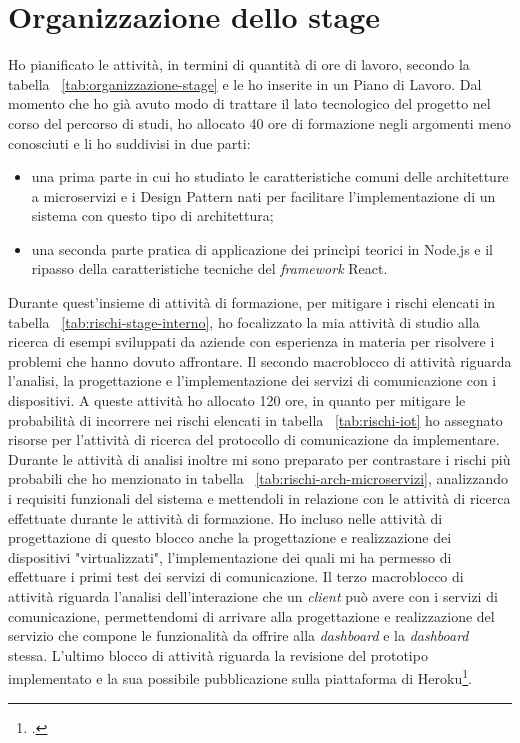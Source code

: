 \section{Organizzazione dello stage}

Ho pianificato le attività, in termini di quantità di ore di lavoro, secondo la tabella ~\ref{tab:organizzazione-stage} e le ho inserite in un Piano di Lavoro.
Dal momento che ho già avuto modo di trattare il lato tecnologico del progetto nel corso del percorso di studi, ho allocato 40 ore di formazione negli argomenti meno conosciuti e li ho suddivisi in due parti:
\begin{itemize}
  \item una prima parte in cui ho studiato le caratteristiche comuni delle architetture a microservizi e i Design Pattern nati per facilitare l'implementazione di un sistema con questo tipo di architettura;
  \item una seconda parte pratica di applicazione dei princìpi teorici in Node.js e il ripasso della caratteristiche tecniche del \emph{framework} React.
\end{itemize}
Durante quest'insieme di attività di formazione, per mitigare i rischi elencati in tabella ~\ref{tab:rischi-stage-interno}, ho focalizzato la mia attività di studio alla ricerca di esempi sviluppati da aziende con esperienza in materia per risolvere i problemi che hanno dovuto affrontare.
Il secondo macroblocco di attività riguarda l'analisi, la progettazione e l'implementazione dei servizi di comunicazione con i dispositivi. A queste attività ho allocato 120 ore, in quanto per mitigare le probabilità di incorrere nei rischi elencati in tabella ~\ref{tab:rischi-iot} ho assegnato risorse per l'attività di ricerca del protocollo di comunicazione da implementare. Durante le attività di analisi inoltre mi sono preparato per contrastare i rischi più probabili che ho menzionato in tabella ~\ref{tab:rischi-arch-microservizi}, analizzando i requisiti funzionali del sistema e mettendoli in relazione con le attività di ricerca effettuate durante le attività di formazione. Ho incluso nelle attività di progettazione di questo blocco anche la progettazione e realizzazione dei dispositivi "virtualizzati", l'implementazione dei quali mi ha permesso di effettuare i primi test dei servizi di comunicazione.
Il terzo macroblocco di attività riguarda l'analisi dell'interazione che un \emph{client} può avere con i servizi di comunicazione, permettendomi di arrivare alla progettazione e realizzazione del servizio che compone le funzionalità da offrire alla \emph{dashboard} e la \emph{dashboard} stessa.
L'ultimo blocco di attività riguarda la revisione del prototipo implementato e la sua possibile pubblicazione sulla piattaforma di Heroku\footcite{heroku}.

